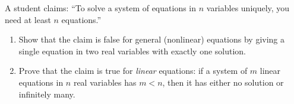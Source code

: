 A student claims: ``To solve a system of equations in $n$ variables uniquely, you need at least $n$ equations.''
\begin{enumerate}
\item[(a)] Show that the claim is false for general (nonlinear) equations by giving a single equation in two real variables with exactly one solution.
\item[(b)] Prove that the claim is true for \emph{linear} equations: if a system of $m$ linear equations in $n$ real variables has $m<n$, then it has either no solution or infinitely many.
\end{enumerate}
